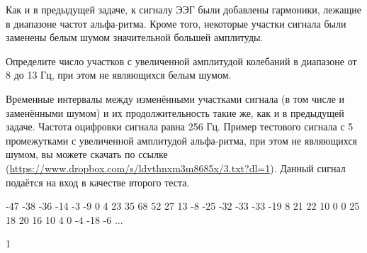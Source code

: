 
Как и в предыдущей задаче, к сигналу ЭЭГ были добавлены гармоники, лежащие в диапазоне частот альфа-ритма. Кроме того, некоторые участки сигнала были заменены белым шумом значительной большей амплитуды.

Определите число участков с увеличенной амплитудой колебаний в диапазоне от 8 до 13 Гц, при этом не являющихся белым шумом.

Временные интервалы между изменёнными участками сигнала (в том числе и заменёнными шумом) и их продолжительность 
такие же, как и в предыдущей задаче. Частота оцифровки сигнала равна 256 Гц. Пример тестового сигнала с 5 
промежутками с увеличенной амплитудой альфа-ритма, при этом не являющихся шумом, вы можете скачать по ссылке (\url{https://www.dropbox.com/s/ldvthnxm3m8685x/3.txt?dl=1}). Данный сигнал подаётся на вход в качестве второго теста.


\begin{myverbbox}[\small]{\vinput}
    -47 -38 -36 -14 -3 -9 0 4 23 35 68 52 27 13 -8 -25 -32 
    -33 -33 -19 8 21 22 10 0 0 25 18 20 16 10 4 0 -4 -18 -6 
    ... 
\end{myverbbox}
\begin{myverbbox}[\small]{\voutput}
    1
\end{myverbbox}

